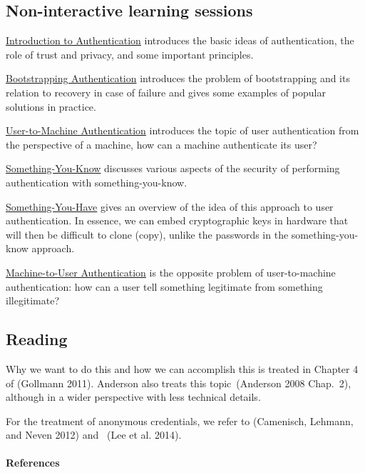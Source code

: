 \hypertarget{non-interactive-learning-sessions}{%
\subsection{Non-interactive learning
sessions}\label{non-interactive-learning-sessions}}

\href{https://youtu.be/aqYyxhGeRQc}{Introduction to Authentication}
introduces the basic ideas of authentication, the role of trust and
privacy, and some important principles.

\href{https://youtu.be/OPVZQ5TJnqk}{Bootstrapping Authentication}
introduces the problem of bootstrapping and its relation to recovery in
case of failure and gives some examples of popular solutions in
practice.

\href{https://youtu.be/wEc0FFxw6aY}{User-to-Machine Authentication}
introduces the topic of user authentication from the perspective of a
machine, how can a machine authenticate its user?

\href{https://youtu.be/A9-nBFnZszk}{Something-You-Know} discusses
various aspects of the security of performing authentication with
something-you-know.

\href{https://youtu.be/W_7DJ5T4TDs}{Something-You-Have} gives an
overview of the idea of this approach to user authentication. In
essence, we can embed cryptographic keys in hardware that will then be
difficult to clone (copy), unlike the passwords in the
something-you-know approach.

\href{https://youtu.be/71GlqDmesRc}{Machine-to-User Authentication} is
the opposite problem of user-to-machine authentication: how can a user
tell something legitimate from something illegitimate?

\hypertarget{reading}{%
\subsection{Reading}\label{reading}}

Why we want to do this and how we can accomplish this is treated in
Chapter 4 of {(Gollmann 2011)}. Anderson also treats this
topic~{(Anderson 2008 Chap.~2)}, although in a wider perspective with
less technical details.

For the treatment of anonymous credentials, we refer to {(Camenisch,
Lehmann, and Neven 2012)} and ~{(Lee et al. 2014)}.

\hypertarget{references}{%
\paragraph{References}\label{references}}

